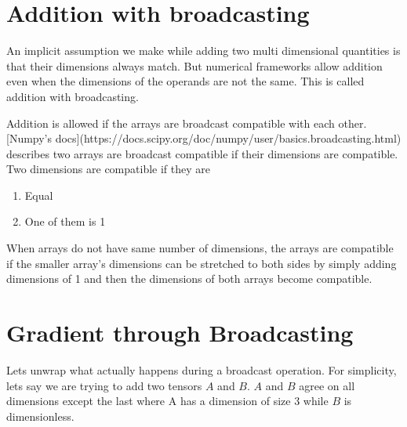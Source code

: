 \documentclass[12pt,crop=false,class=article,convert={density=300,outext=.compiled.png}]{standalone}
\begin{document}
\section*{Addition with broadcasting}
An implicit assumption we make while adding two multi dimensional quantities is that their dimensions always match. But numerical frameworks allow addition even when the dimensions of the operands are not the same. This is called addition with broadcasting.

Addition is allowed if the arrays are broadcast compatible with each other. [Numpy's docs](https://docs.scipy.org/doc/numpy/user/basics.broadcasting.html) describes two arrays are broadcast compatible if their dimensions are compatible. Two dimensions are compatible if they are 
\begin{enumerate}
\item Equal
\item One of them is 1
\end{enumerate}
When arrays do not have same number of dimensions, the arrays are compatible if the smaller array's dimensions can be stretched to both sides by simply adding dimensions of 1 and then the dimensions of both arrays become compatible.

\section*{Gradient through Broadcasting}
Lets unwrap what actually happens during a broadcast operation. For simplicity, lets say we are trying to add two tensors $A$ and $B$. $A$ and $B$ agree on all dimensions except the last where A has a dimension of size $3$ while $B$ is dimensionless. 
\end{document}
